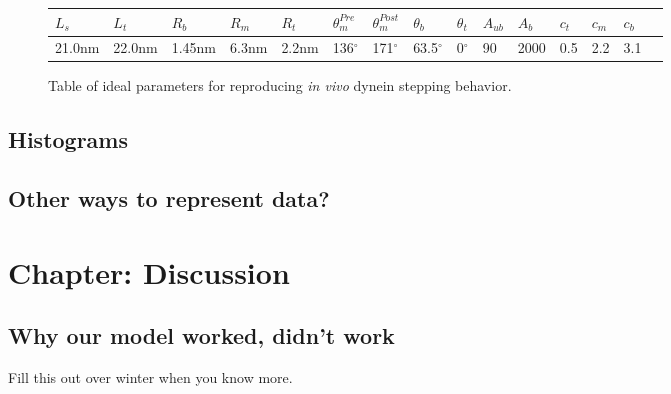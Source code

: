 \documentclass[10pt]{article} %
\begin{document}
\begin{figure}[h]
  \centering
  \begin{tabular}{| l | l | l | l | l | l | l | l | l | l | l | l | l | l | l |}
    \hline
    $L_s$ & $L_t$ & $R_b$ & $R_m$ & $R_t$ & $\theta_{m}^{Pre}$ & $\theta_{m}^{Post}$ & $\theta_{b}$ & $\theta_{t}$ & $A_{ub}$ & $A_b$ & $c_t$ & $c_m$  &$c_b$\\ \hline
    21.0nm & 22.0nm & 1.45nm & 6.3nm & 2.2nm & 136$^{\circ}$ & 171$^{\circ}$ & 63.5$^{\circ}$ & 0$^{\circ}$ & 90 & 2000 & 0.5 & 2.2  & 3.1\\ \hline
  \end{tabular}
  \caption{Table of ideal parameters for reproducing \textit{in vivo} dynein stepping behavior.}
  \label{final-parameter-table}
\end{figure}

\subsection{Histograms}


\subsection{Other ways to represent data?}

\section{Chapter: Discussion}
\subsection{Why our model worked, didn’t work}
Fill this out over winter when you know more.\\
\end{document}
